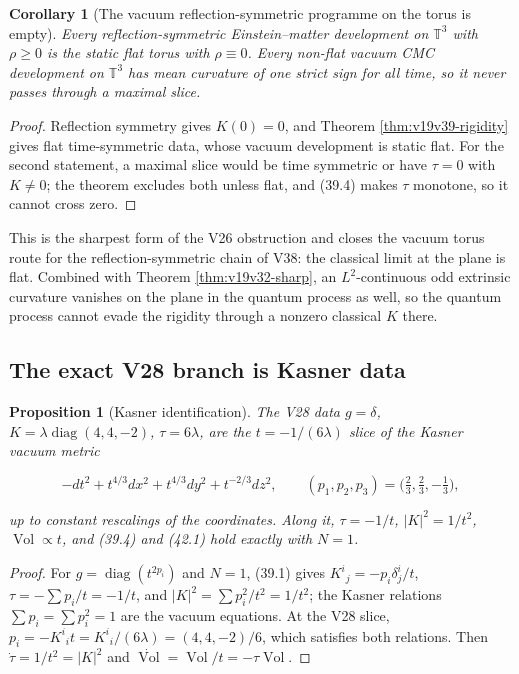 \documentclass[11pt]{article}
\newtheorem{proposition}[theorem]{Proposition}
\newtheorem{corollary}[theorem]{Corollary}
\theoremstyle{remark}
\begin{document}
\begin{corollary}[The vacuum reflection-symmetric programme on the torus is empty]
\label{cor:v19v39-empty}
Every reflection-symmetric Einstein--matter development on
\(\mathbb T^3\) with \(\rho\geq0\) is the static flat torus with
\(\rho\equiv0\).  Every non-flat vacuum CMC development on
\(\mathbb T^3\) has mean curvature of one strict sign for all time, so
it never passes through a maximal slice.
\end{corollary}

\begin{proof}
Reflection symmetry gives \(K(0)=0\), and Theorem
\ref{thm:v19v39-rigidity} gives flat time-symmetric data, whose vacuum
development is static flat.  For the second statement, a maximal slice
would be time symmetric or have \(\tau=0\) with \(K\neq0\); the theorem
excludes both unless flat, and (39.4) makes \(\tau\) monotone, so it
cannot cross zero.
\end{proof}

This is the sharpest form of the V26 obstruction and closes the
vacuum torus route for the reflection-symmetric chain of V38: the
classical limit at the plane is flat.  Combined with Theorem
\ref{thm:v19v32-sharp}, an \(L^2\)-continuous odd extrinsic curvature
vanishes on the plane in the quantum process as well, so the quantum
process cannot evade the rigidity through a nonzero classical \(K\)
there.

\subsection{The exact V28 branch is Kasner data}

\begin{proposition}[Kasner identification]
\label{prop:v19v39-kasner}
The V28 data \(g=\delta\), \(K=\lambda\operatorname{diag}(4,4,-2)\),
\(\tau=6\lambda\), are the \(t=-1/(6\lambda)\) slice of the Kasner
vacuum metric

\[
 -dt^2+t^{4/3}dx^2+t^{4/3}dy^2+t^{-2/3}dz^2,
 \qquad (p_1,p_2,p_3)=\bigl(\tfrac23,\tfrac23,-\tfrac13\bigr),         \tag{42.3}
\]

up to constant rescalings of the coordinates.  Along it,
\(\tau=-1/t\), \(|K|^2=1/t^2\), \(\operatorname{Vol}\propto t\), and
(39.4) and (42.1) hold exactly with \(N=1\).
\end{proposition}

\begin{proof}
For \(g=\operatorname{diag}(t^{2p_i})\) and \(N=1\), (39.1) gives
\(K^i{}_j=-p_i\delta^i_j/t\), \(\tau=-\sum p_i/t=-1/t\), and
\(|K|^2=\sum p_i^2/t^2=1/t^2\); the Kasner relations
\(\sum p_i=\sum p_i^2=1\) are the vacuum equations.  At the V28 slice,
\(p_i=-K^i{}_it=K^i{}_i/(6\lambda)=(4,4,-2)/6\), which satisfies both
relations.  Then \(\dot\tau=1/t^2=|K|^2\) and
\(\dot{\operatorname{Vol}}=\operatorname{Vol}/t=-\tau\operatorname{Vol}\).
\end{proof}
\end{document}
